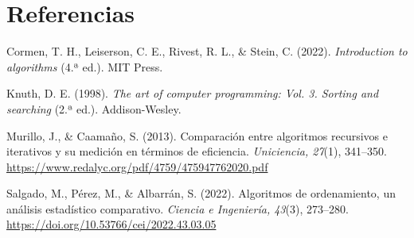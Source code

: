 \documentclass[12pt,a4paper,twocolumn]{article}
\begin{document}
\section*{Referencias}
 
{\small\sloppy
\setlength{\parindent}{0pt}
\setlength{\parskip}{3pt}
 
\hangindent=0.5cm
Cormen, T. H., Leiserson, C. E., Rivest, R. L., \& Stein, C. (2022).
\textit{Introduction to algorithms} (4.ª ed.). MIT Press.\par
 
\hangindent=0.5cm
Knuth, D. E. (1998). \textit{The art of computer programming: Vol. 3.
Sorting and searching} (2.ª ed.). Addison-Wesley.\par
 
\hangindent=0.5cm
Murillo, J., \& Caamaño, S. (2013). Comparación entre algoritmos
recursivos e iterativos y su medición en términos de eficiencia.
\textit{Uniciencia, 27}(1), 341--350.
\url{https://www.redalyc.org/pdf/4759/475947762020.pdf}\par
 
\hangindent=0.5cm
Salgado, M., Pérez, M., \& Albarrán, S. (2022). Algoritmos de ordenamiento,
un análisis estadístico comparativo. \textit{Ciencia e Ingeniería,
43}(3), 273--280. \url{https://doi.org/10.53766/cei/2022.43.03.05}\par
}
 
 
\end{document}
